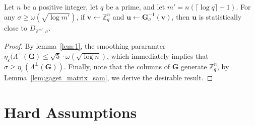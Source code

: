 \begin{lemma}
\label{lem:5}
Let $n$ be a positive integer, let $q$ be a prime, and let
$m' = n(\lceil \log q \rceil + 1)$. For any
$\sigma \geq \omega(\sqrt{\log m'})$, if
$\mathbf{v} \leftarrow \mathbb{Z}_q^n$ and
$\mathbf{u} \leftarrow \mathbf{G}_{\sigma}^{-1}(\mathbf{v})$, then
$\mathbf{u}$ is statistically close to
$D_{\mathbb{Z}^{m'},\sigma}$.
\end{lemma}
\begin{proof}
By lemma~\ref{lem:1}, the smoothing pararamter $\eta_{\varepsilon}(\Lambda^\perp(\mathbf{G}) \leq \sqrt{5}\cdot \omega(\sqrt{\log n})$, which immediately implies that $\sigma \geq \eta_{\varepsilon}(\Lambda^\perp(\mathbf{G}))$. Finally, note that the columns of $\mathbf{G}$ generate $\mathbb{Z}_q^n$, by Lemma~\ref{lem:gaget_matrix_sam}, we derive the desirable result.
\end{proof}
\section{Hard Assumptions}

